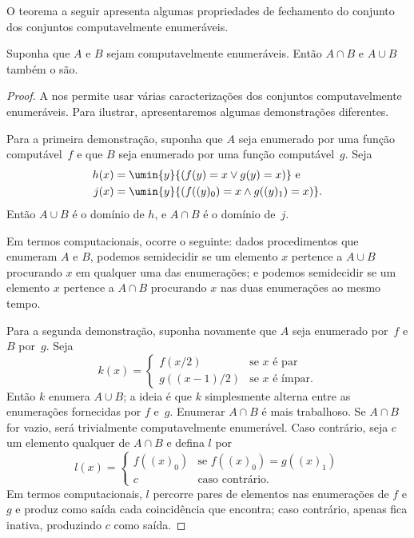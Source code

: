 \documentclass[../../../include/open-logic-section]{subfiles}
\begin{document}


O teorema a seguir apresenta algumas propriedades de fechamento do
conjunto dos conjuntos computavelmente enumeráveis.

\begin{thm}
Suponha que $A$ e $B$ sejam computavelmente enumeráveis. Então
$A \cap B$ e $A \cup B$ também o são.
\end{thm}

\begin{proof}
A  nos permite usar várias caracterizações
dos conjuntos computavelmente enumeráveis. Para ilustrar, apresentaremos
algumas demonstrações diferentes.

Para a primeira demonstração, suponha que $A$ seja enumerado por uma
função computável~$f$ e que $B$ seja enumerado por uma função
computável~$g$. Seja
\begin{align*}
h(x) & = \umin{y}{(f(y) = x \lor g(y) = x)} \text{ e}\\
j(x) & = \umin{y}{(f((y)_0) = x \land g((y)_1) = x)}.
\end{align*}
Então $A \cup B$ é o domínio de $h$, e $A \cap B$ é o domínio de~$j$.

\begin{explain}
Em termos computacionais, ocorre o seguinte: dados procedimentos que
enumeram $A$ e $B$, podemos semidecidir se um elemento $x$ pertence a
$A \cup B$ procurando $x$ em qualquer uma das enumerações; e podemos
semidecidir se um elemento $x$ pertence a $A \cap B$ procurando $x$
nas duas enumerações ao mesmo tempo.
\end{explain}

Para a segunda demonstração, suponha novamente que $A$ seja enumerado
por~$f$ e $B$ por~$g$. Seja
\[
k(x) = \begin{cases}
f(x/2) & \text{se $x$ é par} \\
g((x-1)/2) & \text{se $x$ é ímpar.}
\end{cases}
\]
Então $k$ enumera $A \cup B$; a ideia é que $k$ simplesmente alterna
entre as enumerações fornecidas por $f$ e~$g$. Enumerar $A \cap B$ é
mais trabalhoso. Se $A \cap B$ for vazio, será trivialmente
computavelmente enumerável. Caso contrário, seja $c$ um elemento
qualquer de $A \cap B$ e defina $l$ por
\[
l(x) = \begin{cases}
f((x)_0) & \text{se $f((x)_0) = g((x)_1)$} \\
c & \text{caso contrário.}
\end{cases}
\]
Em termos computacionais, $l$ percorre pares de elementos nas
enumerações de $f$ e $g$ e produz como saída cada coincidência que
encontra; caso contrário, apenas fica inativa, produzindo $c$ como
saída.


\end{proof}
\end{document}
